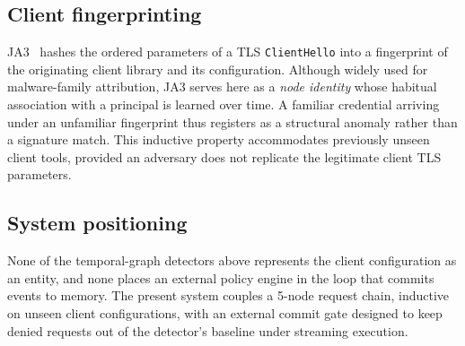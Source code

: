 \subsection{Client fingerprinting}

JA3~\cite{ja3} hashes the ordered parameters of a TLS \texttt{ClientHello} into a
fingerprint of the originating client library and its configuration. Although widely used for
malware-family attribution, JA3 serves here as a \emph{node identity} whose habitual
association with a principal is learned over time. A familiar credential arriving
under an unfamiliar fingerprint thus registers as a structural anomaly rather than a signature match.
This inductive property accommodates previously unseen client tools, provided an adversary
does not replicate the legitimate client TLS parameters.

\subsection{System positioning}

None of the temporal-graph detectors above represents the client configuration as an
entity, and none places an external policy engine in the loop that commits events to memory.
The present system couples a 5-node request chain, inductive on unseen client
configurations, with an external commit gate designed to keep denied requests out of the
detector's baseline under streaming execution.
